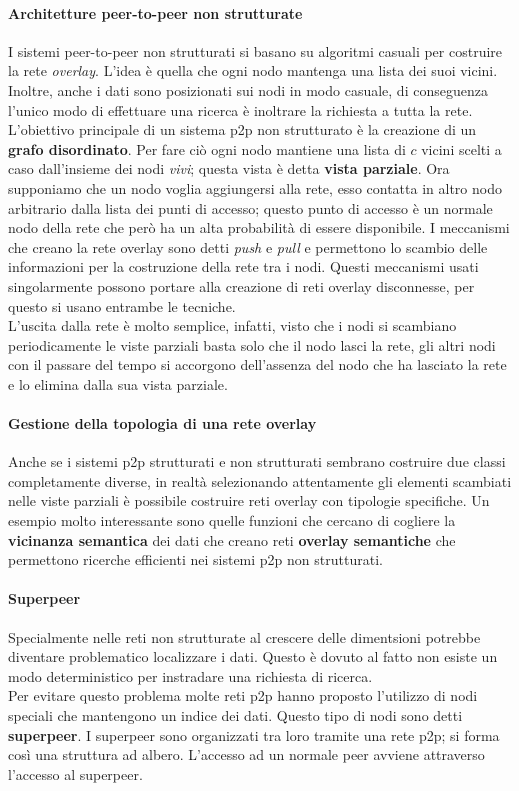 \paragraph{Architetture peer-to-peer non strutturate}
I sistemi peer-to-peer non strutturati si basano su algoritmi casuali per costruire la rete \emph{overlay}. L'idea è quella che ogni nodo mantenga una lista dei suoi vicini. Inoltre, anche i dati sono posizionati sui nodi in modo casuale, di conseguenza l'unico modo di effettuare una ricerca è inoltrare la richiesta a tutta la rete.\\
L'obiettivo principale di un sistema p2p non strutturato è la creazione di un \textbf{grafo disordinato}. Per fare ciò ogni nodo mantiene una lista di $c$ vicini scelti a caso dall'insieme dei nodi \emph{vivi}; questa vista è detta \textbf{vista parziale}.
Ora supponiamo che un nodo voglia aggiungersi alla rete, esso contatta in altro nodo arbitrario dalla lista dei punti di accesso; questo punto di accesso è un normale nodo della rete che però ha un alta probabilità di essere disponibile. I meccanismi che creano la rete overlay sono detti \emph{push} e \emph{pull} e permettono lo scambio delle informazioni per la costruzione della rete tra i nodi. Questi meccanismi usati singolarmente possono portare alla creazione di reti overlay disconnesse, per questo si usano entrambe le tecniche.\\
L'uscita dalla rete è molto semplice, infatti, visto che i nodi si scambiano periodicamente le viste parziali basta solo che il nodo lasci la rete, gli altri nodi con il passare del tempo si accorgono dell'assenza del nodo che ha lasciato la rete e lo elimina dalla sua vista parziale.
\paragraph{Gestione della topologia di una rete overlay}
Anche se i sistemi p2p strutturati e non strutturati sembrano costruire due classi completamente diverse, in realtà selezionando attentamente gli elementi scambiati nelle viste parziali è possibile costruire reti overlay con tipologie specifiche. Un esempio molto interessante sono quelle funzioni che cercano di cogliere la \textbf{vicinanza semantica} dei dati che creano reti \textbf{overlay semantiche} che permettono ricerche efficienti nei sistemi p2p non strutturati.
\paragraph{Superpeer}
Specialmente nelle reti non strutturate al crescere delle dimentsioni potrebbe diventare problematico localizzare i dati. Questo è dovuto al fatto non esiste un modo deterministico per instradare una richiesta di ricerca.\\
Per evitare questo problema molte reti p2p hanno proposto l'utilizzo di nodi speciali che mantengono un indice dei dati. Questo tipo di nodi sono detti \textbf{superpeer}. I superpeer sono organizzati tra loro tramite una rete p2p; si forma così una struttura ad albero. L'accesso ad un normale peer avviene attraverso l'accesso al superpeer.
